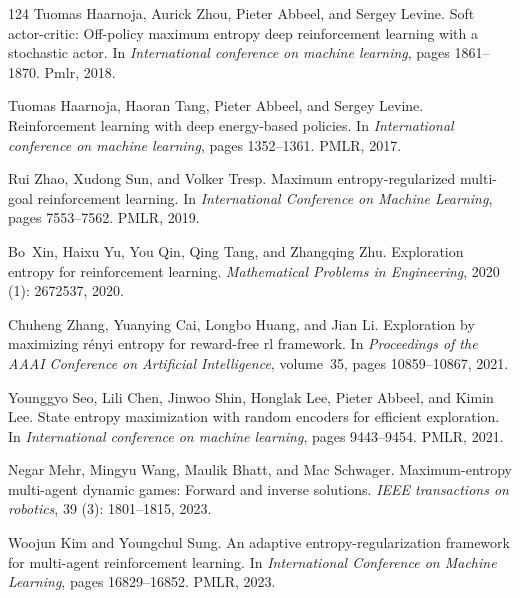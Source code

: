 \documentclass[]{youtu} %
\begin{document}
\begin{thebibliography}{124}
Tuomas Haarnoja, Aurick Zhou, Pieter Abbeel, and Sergey Levine.
\newblock Soft actor-critic: Off-policy maximum entropy deep reinforcement learning with a stochastic actor.
\newblock In \emph{International conference on machine learning}, pages 1861--1870. Pmlr, 2018.

Tuomas Haarnoja, Haoran Tang, Pieter Abbeel, and Sergey Levine.
\newblock Reinforcement learning with deep energy-based policies.
\newblock In \emph{International conference on machine learning}, pages 1352--1361. PMLR, 2017.

Rui Zhao, Xudong Sun, and Volker Tresp.
\newblock Maximum entropy-regularized multi-goal reinforcement learning.
\newblock In \emph{International Conference on Machine Learning}, pages 7553--7562. PMLR, 2019.

Bo~Xin, Haixu Yu, You Qin, Qing Tang, and Zhangqing Zhu.
\newblock Exploration entropy for reinforcement learning.
\newblock \emph{Mathematical Problems in Engineering}, 2020 (1): 2672537, 2020.

Chuheng Zhang, Yuanying Cai, Longbo Huang, and Jian Li.
\newblock Exploration by maximizing r{\'e}nyi entropy for reward-free rl framework.
\newblock In \emph{Proceedings of the AAAI Conference on Artificial Intelligence}, volume~35, pages 10859--10867, 2021.

Younggyo Seo, Lili Chen, Jinwoo Shin, Honglak Lee, Pieter Abbeel, and Kimin Lee.
\newblock State entropy maximization with random encoders for efficient exploration.
\newblock In \emph{International conference on machine learning}, pages 9443--9454. PMLR, 2021.

Negar Mehr, Mingyu Wang, Maulik Bhatt, and Mac Schwager.
\newblock Maximum-entropy multi-agent dynamic games: Forward and inverse solutions.
\newblock \emph{IEEE transactions on robotics}, 39 (3): 1801--1815, 2023.

Woojun Kim and Youngchul Sung.
\newblock An adaptive entropy-regularization framework for multi-agent reinforcement learning.
\newblock In \emph{International Conference on Machine Learning}, pages 16829--16852. PMLR, 2023.


\end{thebibliography}
\end{document}
